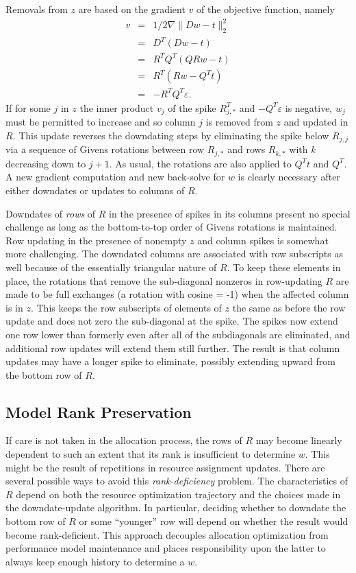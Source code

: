 Removals from $z$ are based on the gradient $v$ of the objective function, namely
\begin{eqnarray*}
v &=& 1/2\nabla\|Dw - t\|^2_2 \\
  &=& D^T(Dw - t)             \\
  &=& R^TQ^T(QRw - t)         \\
  &=& R^T(Rw - Q^Tt)          \\
  &=& -R^TQ^T\varepsilon.
\end{eqnarray*}
If for some $j$ in $z$ the inner product $v_j$ of the spike $R^T_{j,*}$ and $-Q^T\varepsilon$ is negative,
$w_j$ must be permitted to increase and so column $j$ is removed from $z$ and updated in $R$.
This update reverses the downdating steps by eliminating the spike below $R_{j,j}$
via a sequence of Givens rotations between row $R_{j,*}$ and rows $R_{k,*}$ with $k$ decreasing down to $j+1$.
As usual, the rotations are also applied to $Q^Tt$ and $Q^T$.
A new gradient computation and new back-solve for $w$ is clearly necessary after either downdates or updates to columns of $R$.

Downdates of \emph{rows} of $R$ in the presence of spikes in its columns present no special challenge
as long as the bottom-to-top order of Givens rotations is maintained.
Row updating in the presence of nonempty $z$ and column spikes is somewhat more challenging.
The downdated columns are associated with row subscripts as well because of the essentially triangular nature of $R$.
To keep these elements in place, the rotations that remove the sub-diagonal nonzeros in row-updating $R$
are made to be full exchanges (a rotation with cosine = -1) when the affected column is in $z$.
This keeps the row subscripts of elements of $z$ the same as before the row update and does not zero the sub-diagonal at the spike.
The spikes now extend one row lower than formerly even after all of the subdiagonals are eliminated,
and additional row updates will extend them still further.  The result is that column updates may have a longer spike to eliminate,
possibly extending upward from the bottom row of $R$.

\subsection*{Model Rank Preservation}

If care is not taken in the allocation process,
the rows of $R$ may become linearly dependent
to such an extent that its rank is insufficient to determine $w$.
This might be the result of repetitions in resource assignment updates.
There are several possible ways to avoid this \emph{rank-deficiency} problem.
The characteristics of $R$ depend on both the resource optimization trajectory and the
choices made in the downdate-update algorithm.
In particular, deciding whether to downdate the bottom row of $R$ or some ``younger'' row
will depend on whether the result would become rank-deficient.
This approach decouples allocation optimization from performance model maintenance
and places responsibility upon the latter to always keep enough history to determine a $w$.

